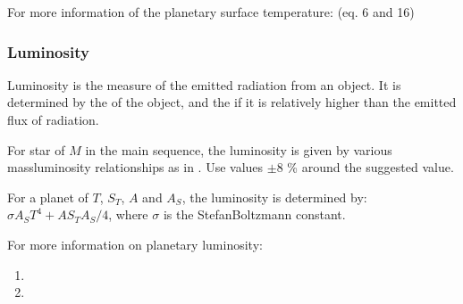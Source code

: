\documentclass[letterpaper,10pt,english]{sphinxmanual}
\begin{document}
\sphinxAtStartPar
For more information of the planetary surface temperature:
 (eq. 6 and 16)


\subsubsection{Luminosity}
\label{\detokenize{quantities/surface/emission/luminosity:luminosity}}\label{\detokenize{quantities/surface/emission/luminosity::doc}}\label{\detokenize{quantities/surface/emission/luminosity:id1}}
\sphinxAtStartPar
Luminosity is the measure of the emitted radiation from an object.
It is determined by the {\hyperref[\detokenize{quantities/material/mass:id1}]{}} of the object, and the
{\hyperref[\detokenize{quantities/surface/emission/incident_flux:id1}]{}} if it is relatively higher than the emitted flux
of radiation.

\sphinxAtStartPar
For star of {\hyperref[\detokenize{quantities/material/mass:id1}]{}} \(M\) in the main sequence, the luminosity
is given by various mass\sphinxhyphen{}luminosity relationships as in .
Use values \(\pm 8\) \% around the suggested value.

\sphinxAtStartPar
For a planet of {\hyperref[\detokenize{quantities/surface/emission/temperature:id1}]{}} \(T\),
{\hyperref[\detokenize{quantities/surface/emission/incident_flux:id1}]{}} \(S_T\),
{\hyperref[\detokenize{quantities/surface/emission/albedo:id1}]{}} \(A\) and {\hyperref[\detokenize{quantities/geometric/surface_area:id1}]{}} \(A_S\),
the luminosity is determined by:
\(\sigma A_S T ^ 4 + A S_T A_S / 4\),
where \(\sigma\) is the Stefan\sphinxhyphen{}Boltzmann constant.

\sphinxAtStartPar
For more information on planetary luminosity:
\begin{enumerate}
%
\item {} 
\sphinxAtStartPar
{}

\item {} 
\sphinxAtStartPar
{}

\end{enumerate}
\end{document}
